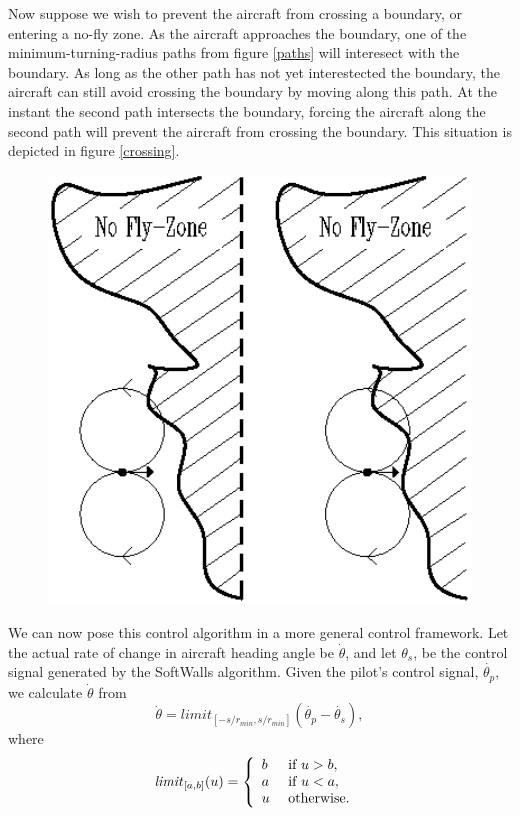 \documentclass[11pt]{article}
\begin{document}
Now suppose we wish to prevent the aircraft from crossing a boundary,
or entering a no-fly zone.  As the aircraft approaches the boundary,
one of the minimum-turning-radius paths from figure \ref{paths} will
interesect with the boundary.  As long as the other path has not yet
interestected the boundary, the aircraft can still avoid crossing the
boundary by moving along this path.  At the instant the second path
intersects the boundary, forcing the aircraft along the second path
will prevent the aircraft from crossing the boundary.  This situation
is depicted in figure \ref{crossing}.

\begin{figure}[btp]
\centering
\includegraphics[width=5in]{boundarycross.eps}
\end{figure}

We can now pose this control algorithm in a more general control
framework.  Let the actual rate of change in aircraft heading angle be
$\dot{\theta}$, and let $\theta_{s}$, be the control signal generated
by the SoftWalls algorithm.  Given the pilot's control signal,
$\dot{\theta_{p}}$, we calculate $\dot{\theta}$ from
\[
\dot{\theta} = limit_{[-s/r_{min}, s/r_{min}]}(\dot{\theta_{p}} -
\dot{\theta_{s}}),
\]
where
\[
\mbox{\textit{limit}}_{[a,b]}(u) = \left \{
\begin{array}{ll}
b&\mbox{ if } u > b,\\
a&\mbox{ if } u < a,\\
u&\mbox{ otherwise. }
\end{array}
\right .
\]
\end{document}

